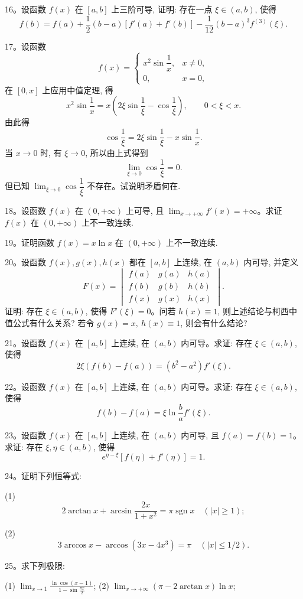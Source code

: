 16。设函数 $f(x)$ 在 $[a,b]$ 上三阶可导, 证明: 存在一点 $\xi\in(a,b)$, 使得
\[
  f(b)=f(a)+\frac12(b-a)[f'(a)+f'(b)]-\frac1{12}(b-a)^3f^{(3)}(\xi).
\]

17。设函数
\[
  f(x)=
  \begin{cases}
    x^2\sin\dfrac1x, & x\ne0,\\[4pt]
    0, & x=0,
  \end{cases}
\]
在 $[0,x]$ 上应用中值定理, 得
\[
  x^2\sin\frac1x=x\left(2\xi\sin\frac1\xi-\cos\frac1\xi\right),\qquad 0<\xi<x.
\]
由此得
\[
  \cos\frac1\xi=2\xi\sin\frac1\xi-x\sin\frac1x.
\]
当 $x\to0$ 时, 有 $\xi\to0$, 所以由上式得到
\[
  \lim_{\xi\to0}\cos\frac1\xi=0.
\]
但已知 $\lim_{\xi\to0}\cos\dfrac1\xi$ 不存在。试说明矛盾何在.

18。设函数 $f(x)$ 在 $(0,+\infty)$ 上可导, 且 $\lim_{x\to+\infty}f'(x)=+\infty$。求证 $f(x)$ 在 $(0,+\infty)$ 上不一致连续.

19。证明函数 $f(x)=x\ln x$ 在 $(0,+\infty)$ 上不一致连续.

20。设函数 $f(x),g(x),h(x)$ 都在 $[a,b]$ 上连续, 在 $(a,b)$ 内可导, 并定义
\[
  F(x)=
  \begin{vmatrix}
    f(a) & g(a) & h(a)\\
    f(b) & g(b) & h(b)\\
    f(x) & g(x) & h(x)
  \end{vmatrix}.
\]
证明: 存在 $\xi\in(a,b)$, 使得 $F'(\xi)=0$。问若 $h(x)\equiv1$, 则上述结论与柯西中值公式有什么关系? 若令 $g(x)=x,\ h(x)\equiv1$, 则会有什么结论?

21。设函数 $f(x)$ 在 $[a,b]$ 上连续, 在 $(a,b)$ 内可导。求证: 存在 $\xi\in(a,b)$, 使得
\[
  2\xi(f(b)-f(a))=(b^2-a^2)f'(\xi).
\]

22。设函数 $f(x)$ 在 $[a,b]$ 上连续, 在 $(a,b)$ 内可导。求证: 存在 $\xi\in(a,b)$, 使得
\[
  f(b)-f(a)=\xi\ln\frac ba f'(\xi).
\]

23。设函数 $f(x)$ 在 $[a,b]$ 上连续, 在 $(a,b)$ 内可导, 且 $f(a)=f(b)=1$。求证: 存在 $\xi,\eta\in(a,b)$, 使得
\[
  e^{\eta-\xi}[f(\eta)+f'(\eta)]=1.
\]

24。证明下列恒等式:

(1)
\[
  2\arctan x+\arcsin\frac{2x}{1+x^2}=\pi\operatorname{sgn}x\quad (|x|\geqslant1);
\]

(2)
\[
  3\arccos x-\arccos(3x-4x^3)=\pi\quad (|x|\leqslant1/2).
\]

25。求下列极限:

(1) $\displaystyle\lim_{x\to1}\frac{\ln\cos(x-1)}{1-\sin\frac{\pi x}2}$;\qquad
(2) $\displaystyle\lim_{x\to+\infty}(\pi-2\arctan x)\ln x$;

